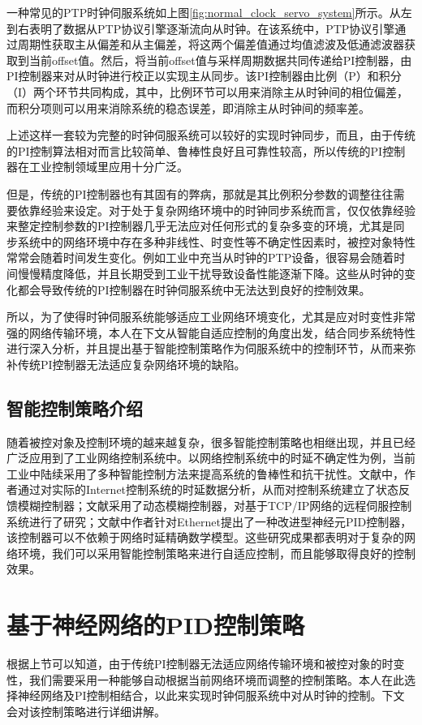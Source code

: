 一种常见的PTP时钟伺服系统如上图\ref{fig:normal_clock_servo_system}所示。从左到右表明了数据从PTP协议引擎逐渐流向从时钟。在该系统中，PTP协议引擎通过周期性获取主从偏差和从主偏差，将这两个偏差值通过均值滤波及低通滤波器获取到当前offset值。然后，将当前offset值与采样周期数据共同传递给PI控制器，由PI控制器来对从时钟进行校正以实现主从同步。该PI控制器由比例（P）和积分（I）两个环节共同构成，其中，比例环节可以用来消除主从时钟间的相位偏差，而积分项则可以用来消除系统的稳态误差，即消除主从时钟间的频率差。

上述这样一套较为完整的时钟伺服系统可以较好的实现时钟同步，而且，由于传统的PI控制算法相对而言比较简单、鲁棒性良好且可靠性较高，所以传统的PI控制器在工业控制领域里应用十分广泛。

但是，传统的PI控制器也有其固有的弊病，那就是其比例积分参数的调整往往需要依靠经验来设定。对于处于复杂网络环境中的时钟同步系统而言，仅仅依靠经验来整定控制参数的PI控制器几乎无法应对任何形式的复杂多变的环境，尤其是同步系统中的网络环境中存在多种非线性、时变性等不确定性因素时，被控对象特性常常会随着时间发生变化。例如工业中充当从时钟的PTP设备，很容易会随着时间慢慢精度降低，并且长期受到工业干扰导致设备性能逐渐下降。这些从时钟的变化都会导致传统的PI控制器在时钟伺服系统中无法达到良好的控制效果。

所以，为了使得时钟伺服系统能够适应工业网络环境变化，尤其是应对时变性非常强的网络传输环境，本人在下文从智能自适应控制的角度出发，结合同步系统特性进行深入分析，并且提出基于智能控制策略作为伺服系统中的控制环节，从而来弥补传统PI控制器无法适应复杂网络环境的缺陷。

\subsection{智能控制策略介绍}
随着被控对象及控制环境的越来越复杂，很多智能控制策略也相继出现，并且已经广泛应用到了工业网络控制系统中。以网络控制系统中的时延不确定性为例，当前工业中陆续采用了多种智能控制方法来提高系统的鲁棒性和抗干扰性\supercite{19,20}。文献\parencite{21}中，作者通过对实际的Internet控制系统的时延数据分析，从而对控制系统建立了状态反馈模糊控制器；文献\parencite{22}采用了动态模糊控制器，对基于TCP/IP网络的远程伺服控制系统进行了研究；文献\parencite{23}中作者针对Ethernet提出了一种改进型神经元PID控制器，该控制器可以不依赖于网络时延精确数学模型。这些研究成果都表明对于复杂的网络环境，我们可以采用智能控制策略来进行自适应控制，而且能够取得良好的控制效果。

\section{基于神经网络的PID控制策略}
根据上节可以知道，由于传统PI控制器无法适应网络传输环境和被控对象的时变性，我们需要采用一种能够自动根据当前网络环境而调整的控制策略。本人在此选择神经网络及PI控制相结合，以此来实现时钟伺服系统中对从时钟的控制。下文会对该控制策略进行详细讲解。


